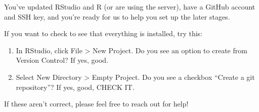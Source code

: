 \documentclass[
]{article}
\providecommand{\tightlist}{%
  \setlength{\itemsep}{0pt}\setlength{\parskip}{0pt}}
\begin{document}
You've updated RStudio and R (or are using the server), have a GitHub
account and SSH key, and you're ready for us to help you set up the
later stages.

If you want to check to see that everything is installed, try this:

\begin{enumerate}
\def\labelenumi{\arabic{enumi}.}
\tightlist
\item
  In RStudio, click File \textgreater{} New Project. Do you see an
  option to create from Version Control? If yes, good.
\item
  Select New Directory \textgreater{} Empty Project. Do you see a
  checkbox ``Create a git repository''? If yes, good, CHECK IT.
\end{enumerate}

If these aren't correct, please feel free to reach out for help!
\end{document}
